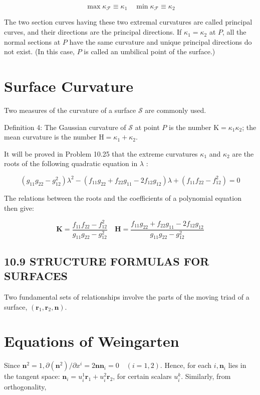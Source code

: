 \documentclass[10pt]{article}
\begin{document}
\begin{equation*}
\max \kappa_{\mathscr{F}} \equiv \kappa_{1} \quad \min \kappa_{\mathscr{F}} \equiv \kappa_{2} \tag{10.24}
\end{equation*}


The two section curves having these two extremal curvatures are called principal curves, and their directions are the principal directions. If $\kappa_{1}=\kappa_{2}$ at $P$, all the normal sections at $P$ have the same curvature and unique principal directions do not exist. (In this case, $P$ is called an umbilical point of the surface.)

\section*{Surface Curvature}
Two measures of the curvature of a surface $\mathscr{S}$ are commonly used.

Definition 4: The Gaussian curvature of $\mathscr{S}$ at point $P$ is the number $\mathrm{K}=\kappa_{1} \kappa_{2}$; the mean curvature is the number $\mathrm{H}=\kappa_{1}+\kappa_{2}$.

It will be proved in Problem 10.25 that the extreme curvatures $\kappa_{1}$ and $\kappa_{2}$ are the roots of the following quadratic equation in $\lambda$ :


\begin{equation*}
\left(g_{11} g_{22}-g_{12}^{2}\right) \lambda^{2}-\left(f_{11} g_{22}+f_{22} g_{11}-2 f_{12} g_{12}\right) \lambda+\left(f_{11} f_{22}-f_{12}^{2}\right)=0 \tag{10.25}
\end{equation*}


The relations between the roots and the coefficients of a polynomial equation then give:


\begin{equation*}
\mathbf{K}=\frac{f_{11} f_{22}-f_{12}^{2}}{g_{11} g_{22}-g_{12}^{2}} \quad \mathbf{H}=\frac{f_{11} g_{22}+f_{22} g_{11}-2 f_{12} g_{12}}{g_{11} g_{22}-g_{12}^{2}} \tag{10.26}
\end{equation*}


\subsection*{10.9 STRUCTURE FORMULAS FOR SURFACES}
Two fundamental sets of relationships involve the parts of the moving triad of a surface, $\left(\mathbf{r}_{1}, \mathbf{r}_{2}, \mathbf{n}\right)$.

\section*{Equations of Weingarten}
Since $\mathbf{n}^{2}=1, \partial\left(\mathbf{n}^{2}\right) / \partial x^{i}=2 \mathbf{n n}_{i}=0 \quad(i=1,2)$. Hence, for each $i, \mathbf{n}_{i}$ lies in the tangent space: $\mathbf{n}_{i}=u_{i}^{1} \mathbf{r}_{1}+u_{i}^{2} \mathbf{r}_{2}$, for certain scalars $u_{i}^{k}$. Similarly, from orthogonality,
\end{document}
